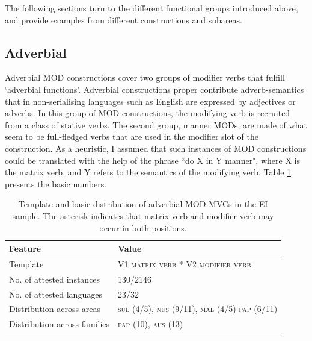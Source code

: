 The following sections turn to the different functional groups introduced above, and provide examples from different constructions and subareas.

\subsection{Adverbial}\label{sec:adverbial}

Adverbial MOD constructions cover two groups of modifier verbs that fulfill `adverbial functions'. Adverbial constructions proper contribute adverb-semantics that in non-serialising languages such as English are expressed by adjectives or adverbs. In this group of MOD constructions, the modifying verb is recruited from a class of stative verbs. The second group, manner MODs, are made of what seem to be full-fledged verbs that are used in the modifier slot of the construction. As a heuristic, I assumed that such instances of MOD constructions could be translated with the help of the phrase ``do X in Y manner", where X is the matrix verb, and Y refers to the semantics of the modifying verb. Table \ref{table:adverbial} presents the basic numbers. 

\begin{table}
\begin{tabular}{ll}
\lsptoprule
Feature&Value\tabularnewline
\midrule
Template&V1 \textsc{matrix verb} * V2 \textsc{modifier verb}\tabularnewline
No. of attested instances& 130/2146 \tabularnewline
No. of attested languages& 23/32 \tabularnewline
Distribution across areas& \textsc{sul} (4/5), \textsc{nus} (9/11), \textsc{mal} (4/5) \textsc{pap} (6/11) \tabularnewline
Distribution across families& \textsc{pap} (10), \textsc{aus} (13) \tabularnewline
\lspbottomrule
\end{tabular}
\caption[Template and basic distribution of adverbial MOD MVCs]{Template and basic distribution of adverbial MOD MVCs in the EI sample. The asterisk indicates that matrix verb and modifier verb may occur in both positions.}
\label{table:adverbial}
\end{table}

